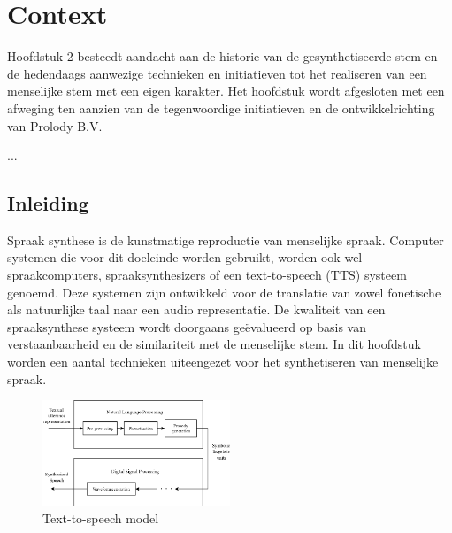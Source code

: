 \chapter{Context}

\begin{center}
  \begin{minipage}{0.5\textwidth}
    \begin{small}
      Hoofdstuk 2 besteedt aandacht aan de historie van de gesynthetiseerde stem en de hedendaags aanwezige technieken en initiatieven tot het realiseren van een menselijke stem met een eigen karakter. Het hoofdstuk wordt afgesloten met een afweging ten aanzien van de tegenwoordige initiatieven en de ontwikkelrichting van Prolody B.V.
    \end{small}
  \end{minipage}
  \vspace{0.5cm}
\end{center}

\noindent ...

\section{Inleiding}

Spraak synthese is de kunstmatige reproductie van menselijke spraak. Computer systemen die voor dit doeleinde worden gebruikt, worden ook wel spraakcomputers, spraaksynthesizers of een text-to-speech (TTS) systeem genoemd. Deze systemen zijn ontwikkeld voor de translatie van zowel fonetische als natuurlijke taal naar een audio representatie. De kwaliteit van een spraaksynthese systeem wordt doorgaans geëvalueerd op basis van verstaanbaarheid en de similariteit met de menselijke stem. In dit hoofdstuk worden een aantal technieken uiteengezet voor het synthetiseren van menselijke spraak.

\begin{figure}[]
    \centering
    \includegraphics[width=0.5\textwidth]{figures/tts_system.png}
    \caption{Text-to-speech model \cite{speect}}
    \label{fig:tts}
\end{figure}

